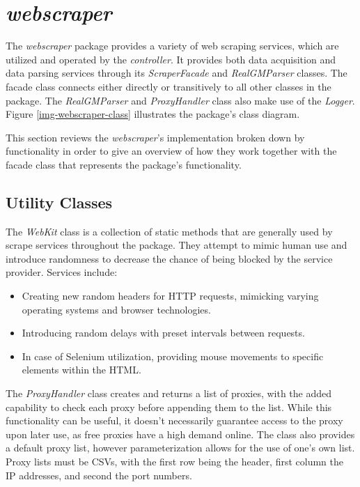 \documentclass{thesis-ekf}
\theoremstyle{definition}
\theoremstyle{remark}
\begin{document}
\section{\emph{webscraper}} \label{sec-webscraper}
The \emph{webscraper} package provides a variety of web scraping services, which are utilized and operated by the \emph{controller}. It provides both data acquisition and data parsing services through its \emph{ScraperFacade} and \emph{RealGMParser} classes. The facade class connects either directly or transitively to all other classes in the package. The \emph{RealGMParser} and \emph{ProxyHandler} class also make use of the \emph{Logger}. Figure \ref{img-webscraper-class} illustrates the package's class diagram.

This section reviews the \emph{webscraper}'s implementation broken down by functionality in order to give an overview of how they work together with the facade class that represents the package's functionality.

\subsection{Utility Classes}
The \emph{WebKit} class is a collection of static methods that are generally used by scrape services throughout the package. They attempt to mimic human use and introduce randomness to decrease the chance of being blocked by the service provider. Services include:
\begin{itemize}
	\item Creating new random headers for HTTP requests, mimicking varying operating systems and browser technologies.
	
	\item Introducing random delays with preset intervals between requests.
	
	\item In case of Selenium utilization, providing mouse movements to specific elements within the HTML.
\end{itemize}

The \emph{ProxyHandler} class creates and returns a list of proxies, with the added capability to check each proxy before appending them to the list. While this functionality can be useful, it doesn't necessarily guarantee access to the proxy upon later use, as free proxies have a high demand online. The class also provides a default proxy list, however parameterization allows for the use of one's own list. Proxy lists must be CSVs, with the first row being the header, first column the IP addresses, and second the port numbers.
\end{document}
